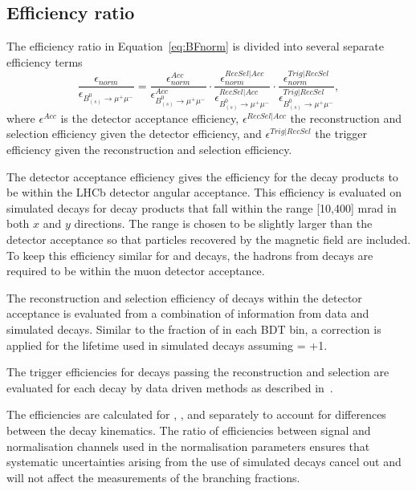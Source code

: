 {\subsection{Efficiency ratio}
\label{sec:effratio}
The efficiency ratio in Equation~\ref{eq:BFnorm} is divided into several separate efficiency terms 
\begin{equation}
\frac{\epsilon_{norm}}{\epsilon_{B^{0}_{(s)} \to \mu^{+} \mu^{-}}}  =  \frac{\epsilon^{Acc}_{norm}}{\epsilon^{Acc}_{B^{0}_{(s)} \to \mu^{+} \mu^{-}}} \cdot \frac{\epsilon^{RecSel|Acc}_{norm}}{\epsilon^{RecSel|Acc}_{B^{0}_{(s)} \to \mu^{+} \mu^{-}}} \cdot \frac{\epsilon^{Trig|RecSel}_{norm}}{\epsilon^{Trig|RecSel}_{B^{0}_{(s)} \to \mu^{+} \mu^{-}}},
\label{eq:BFnormDetailed}
\end{equation}
where $\epsilon^{Acc}$ is the detector acceptance efficiency, $\epsilon^{RecSel|Acc}$ the reconstruction and selection efficiency given the detector efficiency, and $\epsilon^{Trig|RecSel}$ the trigger efficiency given the reconstruction and selection efficiency. 

The detector acceptance efficiency gives the efficiency for the decay products to be within the LHCb detector angular acceptance. This efficiency is evaluated on simulated decays for decay products that fall within the range [10,400] mrad in both $x$ and $y$ directions. The range is chosen to be slightly larger than the detector acceptance so that particles recovered by the magnetic field are included. To keep this efficiency similar for \bmumu and \bdkpi decays, the hadrons from \bdkpi decays are required to be within the muon detector acceptance. 

The reconstruction and selection efficiency of decays within the detector acceptance is evaluated from a combination of information from data and simulated decays. Similar to the fraction of \bsmumu in each BDT bin, a correction is applied for the lifetime used in simulated \bsmumu decays assuming \ADG = +1. 

The trigger efficiencies for decays passing the reconstruction and selection are evaluated for each decay by data driven methods as described in~\cite{Tolk:2148631, Tolk:1557354}. %

The efficiencies are calculated for \bsmumu, \bdmumu, \bdkpi and \bujpsik separately to account for differences between the decay kinematics. The ratio of efficiencies between signal and normalisation channels used in the normalisation parameters ensures that systematic uncertainties arising from the use of simulated decays cancel out and will not affect the measurements of the \bmumu branching fractions.

}
